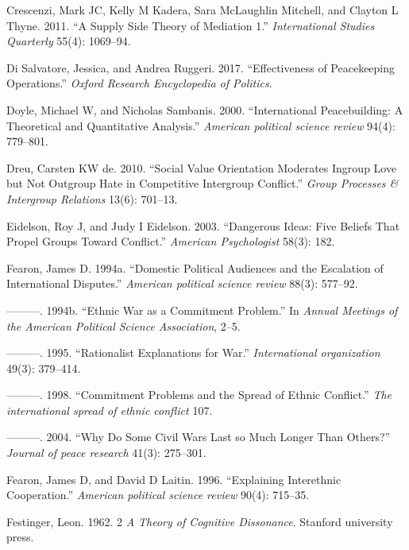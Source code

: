 \documentclass[11pt]{article}
\begin{document}
\hypertarget{ref-crescenzi2011supply}{}
Crescenzi, Mark JC, Kelly M Kadera, Sara McLaughlin Mitchell, and
Clayton L Thyne. 2011. ``A Supply Side Theory of Mediation 1.''
\emph{International Studies Quarterly} 55(4): 1069--94.

\hypertarget{ref-di2017effectiveness}{}
Di Salvatore, Jessica, and Andrea Ruggeri. 2017. ``Effectiveness of
Peacekeeping Operations.'' \emph{Oxford Research Encyclopedia of
Politics}.

\hypertarget{ref-doyle2000international}{}
Doyle, Michael W, and Nicholas Sambanis. 2000. ``International
Peacebuilding: A Theoretical and Quantitative Analysis.'' \emph{American
political science review} 94(4): 779--801.

\hypertarget{ref-dreu2010social}{}
Dreu, Carsten KW de. 2010. ``Social Value Orientation Moderates Ingroup
Love but Not Outgroup Hate in Competitive Intergroup Conflict.''
\emph{Group Processes \& Intergroup Relations} 13(6): 701--13.

\hypertarget{ref-eidelson2003dangerous}{}
Eidelson, Roy J, and Judy I Eidelson. 2003. ``Dangerous Ideas: Five
Beliefs That Propel Groups Toward Conflict.'' \emph{American
Psychologist} 58(3): 182.

\hypertarget{ref-fearon1994domestic}{}
Fearon, James D. 1994a. ``Domestic Political Audiences and the
Escalation of International Disputes.'' \emph{American political science
review} 88(3): 577--92.

\hypertarget{ref-fearon1994ethnic}{}
---------. 1994b. ``Ethnic War as a Commitment Problem.'' In
\emph{Annual Meetings of the American Political Science Association},
2--5.

\hypertarget{ref-fearon1995rationalist}{}
---------. 1995. ``Rationalist Explanations for War.''
\emph{International organization} 49(3): 379--414.

\hypertarget{ref-fearon1998commitment}{}
---------. 1998. ``Commitment Problems and the Spread of Ethnic
Conflict.'' \emph{The international spread of ethnic conflict} 107.

\hypertarget{ref-fearon2004civil}{}
---------. 2004. ``Why Do Some Civil Wars Last so Much Longer Than
Others?'' \emph{Journal of peace research} 41(3): 275--301.

\hypertarget{ref-fearon1996explaining}{}
Fearon, James D, and David D Laitin. 1996. ``Explaining Interethnic
Cooperation.'' \emph{American political science review} 90(4): 715--35.

\hypertarget{ref-festinger1962cognitiveDissonance}{}
Festinger, Leon. 1962. 2 \emph{A Theory of Cognitive Dissonance}.
Stanford university press.
\end{document}
